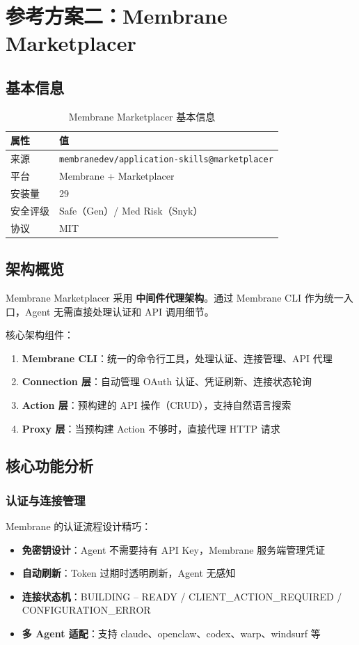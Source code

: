 \documentclass[11pt,a4paper]{article}
\begin{document}
\section{参考方案二：Membrane Marketplacer}

\subsection{基本信息}
\begin{table}[h]
\centering
\begin{tabular}{ll}
\toprule
\textbf{属性} & \textbf{值} \\
\midrule
来源 & \texttt{membranedev/application-skills@marketplacer} \\
平台 & Membrane + Marketplacer \\
安装量 & 29 \\
安全评级 & Safe（Gen）/ Med Risk（Snyk） \\
协议 & MIT \\
\bottomrule
\end{tabular}
\caption{Membrane Marketplacer 基本信息}
\end{table}

\subsection{架构概览}
Membrane Marketplacer 采用 \textbf{中间件代理架构}。通过 Membrane CLI 作为统一入口，Agent 无需直接处理认证和 API 调用细节。

核心架构组件：
\begin{enumerate}
  \item \textbf{Membrane CLI}：统一的命令行工具，处理认证、连接管理、API 代理
  \item \textbf{Connection 层}：自动管理 OAuth 认证、凭证刷新、连接状态轮询
  \item \textbf{Action 层}：预构建的 API 操作（CRUD），支持自然语言搜索
  \item \textbf{Proxy 层}：当预构建 Action 不够时，直接代理 HTTP 请求
\end{enumerate}

\subsection{核心功能分析}

\subsubsection{认证与连接管理}
Membrane 的认证流程设计精巧：
\begin{itemize}
  \item \textbf{免密钥设计}：Agent 不需要持有 API Key，Membrane 服务端管理凭证
  \item \textbf{自动刷新}：Token 过期时透明刷新，Agent 无感知
  \item \textbf{连接状态机}：BUILDING -- READY / CLIENT\_ACTION\_REQUIRED / CONFIGURATION\_ERROR
  \item \textbf{多 Agent 适配}：支持 claude、openclaw、codex、warp、windsurf 等
\end{itemize}
\end{document}
